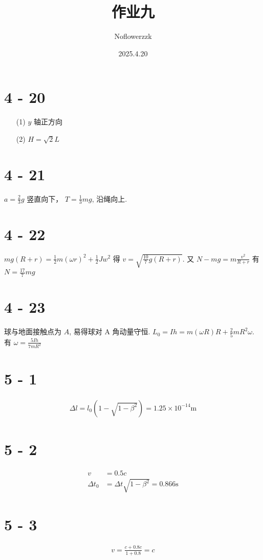\documentclass{article}
\title{作业九}
\author{Noflowerzzk}
\date{2025.4.20}
\begin{document}
\maketitle

\section*{4 - 20}

\begin{itemize}
    \item [(1)] $y$ 轴正方向
    \item [(2)] $H = \sqrt{2}L$
\end{itemize}

\section*{4 - 21}

$a = \frac{2}{3}g$ 竖直向下， $T = \frac{1}{3}mg$, 沿绳向上.

\section*{4 - 22}

$mg(R + r) = \frac{1}{2}m(\omega r)^2 + \frac{1}{2}Jw^2$ 得 $v = \sqrt{\frac{10}{7}g(R + r)}$. 又 $N - mg = m\frac{v^2}{R + r}$ 有 $N = \frac{17}{7}mg$

\section*{4 - 23}

球与地面接触点为 $A$, 易得球对 A 角动量守恒. $L_0 = Ih = m(\omega R)R + \frac{2}{5}mR^2\omega$. 有 $\omega = \frac{5Ih}{7mR^2}$

\section*{5 - 1}

\begin{align*}
    \Delta l = l_0\left(1 - \sqrt{1 - \beta^2}\right) = 1.25 \times 10^{-14} \mathrm{ m}
\end{align*}

\section*{5 - 2}

\begin{align*}
    v &= 0.5 c \\
    \Delta t_0 &= \Delta t \sqrt{1 - \beta^2} = 0.866 \mathrm{ s}
\end{align*}

\section*{5 - 3}

\begin{align*}
    v = \frac{c + 0.8c}{1 + 0.8} = c
\end{align*}
\end{document}
